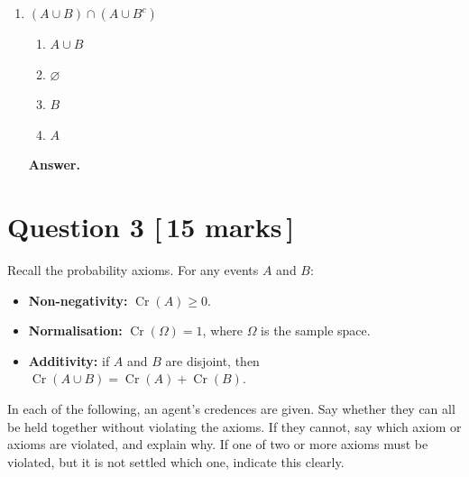 \documentclass[11pt]{article}
\theoremstyle{definition}
\DeclareMathOperator{\Cr}{Cr}
\newenvironment{answer}
  {\par\medskip\noindent\textbf{Answer.}\par\nobreak\smallskip\ignorespaces}
  {\par\medskip}
\begin{document}
\begin{enumerate}[label=(\alph*)]
\item $(A \cup B) \cap (A \cup B^c)$
\begin{enumerate}[label=(\roman*), itemsep=0.1em, topsep=0.25em, parsep=0pt]
	\item $A \cup B$
	\item $\varnothing$
	\item $B$
	\item $A$
\end{enumerate}
\begin{answer}
\end{answer}

\end{enumerate}

\section*{Question 3 \hfill \normalsize [\,15 marks\,]}

Recall the probability axioms. For any events $A$ and $B$:

\begin{itemize}
	\item[--] \textbf{Non-negativity:} $\Cr(A) \geq 0$.
	\item[--] \textbf{Normalisation:} $\Cr(\Omega) = 1$, where $\Omega$ is the
	sample space.
	\item[--] \textbf{Additivity:} if $A$ and $B$ are disjoint, then
	$\Cr(A \cup B) = \Cr(A) + \Cr(B)$.
\end{itemize}

In each of the following, an agent's credences are given. Say whether they can
all be held together without violating the axioms. If they cannot, say which
axiom or axioms are violated, and explain why. If one of two or more axioms must
be violated, but it is not settled which one, indicate this clearly.
\end{document}
